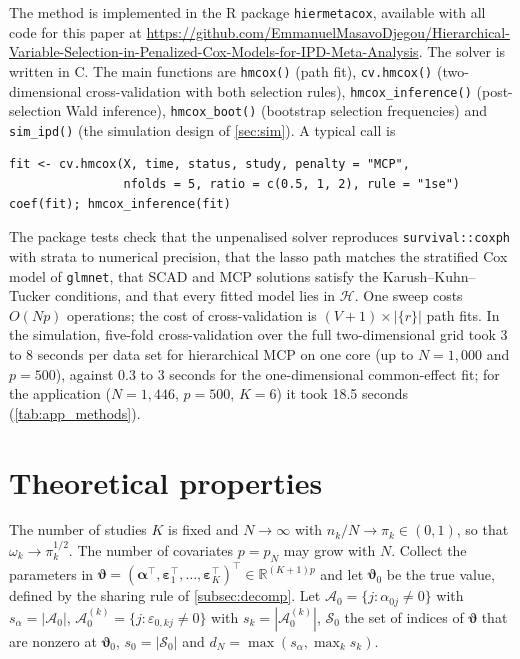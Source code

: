 \documentclass[11pt]{article}
\theoremstyle{remark}
\numberwithin{equation}{section}
\newcommand{\balpha}{\boldsymbol{\alpha}}
\newcommand{\beps}{\boldsymbol{\varepsilon}}
\newcommand{\bvt}{\boldsymbol{\vartheta}}
\newcommand{\Hset}{\mathcal{H}}
\newcommand{\repo}{\url{https://github.com/EmmanuelMasavoDjegou/Hierarchical-Variable-Selection-in-Penalized-Cox-Models-for-IPD-Meta-Analysis}}
\begin{document}
The method is implemented in the R package \texttt{hiermetacox}, available with
all code for this paper at \repo. The solver is written in C. The main functions
are \texttt{hmcox()} (path fit), \texttt{cv.hmcox()} (two-dimensional
cross-validation with both selection rules), \texttt{hmcox\_inference()}
(post-selection Wald inference), \texttt{hmcox\_boot()} (bootstrap selection
frequencies) and \texttt{sim\_ipd()} (the simulation design of \cref{sec:sim}). A
typical call is
{\small\begin{verbatim}
fit <- cv.hmcox(X, time, status, study, penalty = "MCP",
                nfolds = 5, ratio = c(0.5, 1, 2), rule = "1se")
coef(fit); hmcox_inference(fit)
\end{verbatim}}
The package tests check that the unpenalised solver reproduces
\texttt{survival::coxph} with strata to numerical precision, that the lasso path
matches the stratified Cox model of \texttt{glmnet}, that SCAD and MCP solutions
satisfy the Karush--Kuhn--Tucker conditions, and that every fitted model lies in
$\Hset$. One sweep costs $O(Np)$ operations; the cost of cross-validation is
$(V+1)\times|\{r\}|$ path fits. In the simulation, five-fold cross-validation over the full two-dimensional
grid took 3 to 8 seconds per data set for hierarchical MCP on one core (up to
$N=1{,}000$ and $p=500$), against 0.3 to 3 seconds for the one-dimensional
common-effect fit; for the application ($N=1{,}446$, $p=500$, $K=6$) it took
18.5 seconds (\cref{tab:app_methods}).

\section{Theoretical properties}
\label{sec:theory}

The number of studies $K$ is fixed and $N\to\infty$ with $n_k/N\to\pi_k\in(0,1)$,
so that $\omega_k\to\pi_k^{1/2}$. The number of covariates $p=p_N$ may grow with
$N$. Collect the parameters in
$\bvt=(\balpha^\top,\beps_1^\top,\dots,\beps_K^\top)^\top\in\mathbb R^{(K+1)p}$ and
let $\bvt_0$ be the true value, defined by the sharing rule of
\cref{subsec:decomp}. Let $\mathcal A_0=\{j:\alpha_{0j}\neq0\}$ with
$s_\alpha=|\mathcal A_0|$, $\mathcal A_0^{(k)}=\{j:\varepsilon_{0,kj}\neq0\}$ with
$s_k=|\mathcal A_0^{(k)}|$, $\mathcal S_0$ the set of indices of $\bvt$ that are
nonzero at $\bvt_0$, $s_0=|\mathcal S_0|$ and $d_N=\max(s_\alpha,\max_k s_k)$.
\end{document}
